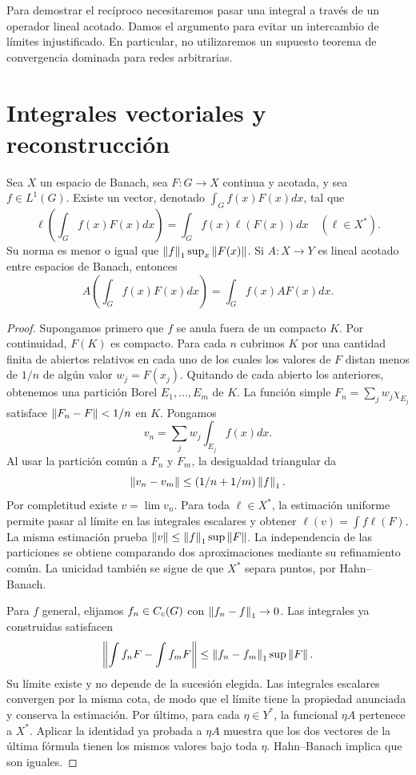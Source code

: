 Para demostrar el recíproco necesitaremos pasar una integral a través de un operador lineal acotado. Damos el argumento para evitar un intercambio de límites injustificado. En particular, no utilizaremos un supuesto teorema de convergencia dominada para redes arbitrarias.

\section{Integrales vectoriales y reconstrucción}
\begin{lema}\label{v4-l24-l:vector}
Sea $X$ un espacio de Banach, sea $F:G\to X$ continua y acotada, y sea $f\in L^1(G)$. Existe un vector, denotado $\int_Gf(x)F(x)dx$, tal que
\[
\ell\left(\int_G f(x)F(x)dx\right)=\int_G f(x)\ell(F(x))dx
\quad(\ell\in X^*).
\]
Su norma es menor o igual que $\left\lVert f\right\rVert_1\sup_x\left\lVert F(x)\right\rVert$. Si $A:X\to Y$ es lineal acotado entre espacios de Banach, entonces
\[
A\left(\int_G f(x)F(x)dx\right)=\int_G f(x)AF(x)dx.
\]
\end{lema}
\begin{proof}
Supongamos primero que $f$ se anula fuera de un compacto $K$. Por continuidad, $F(K)$ es compacto. Para cada $n$ cubrimos $K$ por una cantidad finita de abiertos relativos en cada uno de los cuales los valores de $F$ distan menos de $1/n$ de algún valor $w_j=F(x_j)$. Quitando de cada abierto los anteriores, obtenemos una partición Borel $E_1,\ldots,E_m$ de $K$. La función simple $F_n=\sum_j w_j\chi_{E_j}$ satisface $\left\lVert F_n-F\right\rVert<1/n$ en $K$. Pongamos
\[
v_n=\sum_j w_j\int_{E_j}f(x)dx.
\]
Al usar la partición común a $F_n$ y $F_m$, la desigualdad triangular da
\[
\left\lVert v_n-v_m\right\rVert\leq(1/n+1/m)\left\lVert f\right\rVert_1.
\]
Por completitud existe $v=\lim v_n$. Para toda $\ell\in X^*$, la estimación uniforme permite pasar al límite en las integrales escalares y obtener $\ell(v)=\int f\ell(F)$. La misma estimación prueba $\left\lVert v\right\rVert\leq\left\lVert f\right\rVert_1\sup\left\lVert F\right\rVert$. La independencia de las particiones se obtiene comparando dos aproximaciones mediante su refinamiento común. La unicidad también se sigue de que $X^*$ separa puntos, por Hahn--Banach.

Para $f$ general, elijamos $f_n\in C_c(G)$ con $\left\lVert f_n-f\right\rVert_1\to0$. Las integrales ya construidas satisfacen
\[
\left\lVert\int f_nF-\int f_mF\right\rVert\leq\left\lVert f_n-f_m\right\rVert_1\sup\left\lVert F\right\rVert.
\]
Su límite existe y no depende de la sucesión elegida. Las integrales escalares convergen por la misma cota, de modo que el límite tiene la propiedad anunciada y conserva la estimación. Por último, para cada $\eta\in Y^*$, la funcional $\eta A$ pertenece a $X^*$. Aplicar la identidad ya probada a $\eta A$ muestra que los dos vectores de la última fórmula tienen los mismos valores bajo toda $\eta$. Hahn--Banach implica que son iguales.
\end{proof}

